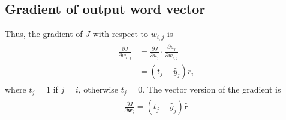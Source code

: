 \documentclass[paper=a4, fontsize=11pt]{scrartcl} %
\numberwithin{equation}{section} %
\numberwithin{figure}{section} %
\numberwithin{table}{section} %
\begin{document}
\subsection{Gradient of output word vector}
Thus, the gradient of $J$ with respect to $w_{i,j}$ is
\begin{align} 
\begin{split}
	\frac{\partial J}{\partial w_{i,j}} &= \frac{\partial J}{\partial u_{j}} \cdot \frac{\partial u_{j}}{\partial w_{i,j}} \\
	 &= (t_{j} - \hat{y}_{j}) r_{i}
\end{split}					
\end{align}
where $t_{j}=1$ if $j=i$, otherwise $t_{j}=0$. The vector version of the gradient is 
\begin{align} 
\begin{split}
	\frac{\partial J}{\partial \boldsymbol{w}_{i}} = (t_{j} - \hat{y}_{j}) \hat{\boldsymbol{r}} 
\end{split}					
\end{align}
\end{document}
